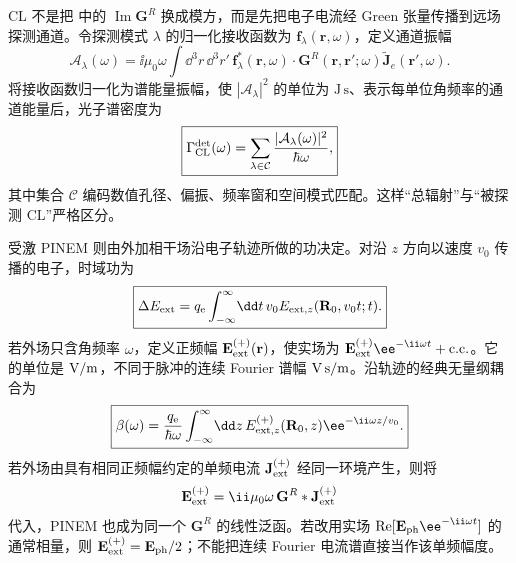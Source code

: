 \begin{definition}[收集通道振幅与光子谱]
CL 不是把 中的 $\operatorname{Im}\mathbf G^R$ 换成模方，而是先把电子电流经 Green 张量传播到远场探测通道。令探测模式 $\lambda$ 的归一化接收函数为 $\mathbf f_\lambda(\mathbf r,\omega)$，定义通道振幅
\begin{equation}
 \mathcal A_\lambda(\omega)
 =\ii\mu_0\omega
 \int\!\dd^3 r\,\dd^3 r'\,
 \mathbf f_\lambda^*(\mathbf r,\omega)\!\cdot
 \mathbf G^R(\mathbf r,\mathbf r';\omega)
 \widetilde{\mathbf J}_e(\mathbf r',\omega).
\label{eq:cl_channel_amplitude_dp47}
\end{equation}
将接收函数归一化为谱能量振幅，使 $|\mathcal A_\lambda|^2$ 的单位为 $\mathrm{J\,s}$、表示每单位角频率的通道能量后，光子谱密度为
\begin{equation}
\boxed{
 \Gamma_{\rm CL}^{\rm det}(\omega)
 =\sum_{\lambda\in\mathcal C}
 \frac{|\mathcal A_\lambda(\omega)|^2}{\hbar\omega},}
\label{eq:cl_detected_green_master_dp47}
\end{equation}
其中集合 $\mathcal C$ 编码数值孔径、偏振、频率窗和空间模式匹配。这样“总辐射”与“被探测 CL”严格区分。

\end{definition}

\begin{proposition}[相干驱动的轨迹积分]
受激 PINEM 则由外加相干场沿电子轨迹所做的功决定。对沿 $z$ 方向以速度 $v_0$ 传播的电子，时域功为
\begin{equation}
\boxed{
 \Delta E_{\rm ext}
 =q_{\mathrm e}\int_{-\infty}^{\infty}\!\dd t\,
 v_0 E_{{\rm ext},z}(\mathbf R_0,v_0t;t).}
\label{eq:pinem_time_domain_work_dp68}
\end{equation}
若外场只含角频率 $\omega$，定义正频幅 $\mathbf E_{\rm ext}^{(+)}(\mathbf r)$，使实场为 $\mathbf E_{\rm ext}^{(+)}\ee^{-\ii\omega t}+\mathrm{c.c.}$。它的单位是 ${\rm V/m}$，不同于脉冲的连续 Fourier 谱幅 ${\rm V\,s/m}$。沿轨迹的经典无量纲耦合为
\begin{equation}
\boxed{
 \beta(\omega)
 =\frac{q_{\mathrm e}}{\hbar\omega}
 \int_{-\infty}^{\infty}\!\dd z\,
 E_{{\rm ext},z}^{(+)}(\mathbf R_0,z)
 \ee^{-\ii\omega z/v_0}.}
\label{eq:pinem_beta_green_unified_dp47}
\end{equation}
若外场由具有相同正频幅约定的单频电流 $\mathbf J_{\rm ext}^{(+)}$ 经同一环境产生，则将
\begin{equation*}
 \mathbf E_{\rm ext}^{(+)}
 =\ii\mu_0\omega\,\mathbf G^R*\mathbf J_{\rm ext}^{(+)}
\end{equation*}
代入，PINEM 也成为同一个 $\mathbf G^R$ 的线性泛函。若改用实场 $\operatorname{Re}[\mathbf E_{\rm ph}\ee^{-\ii\omega t}]$ 的通常相量，则 $\mathbf E_{\rm ext}^{(+)}=\mathbf E_{\rm ph}/2$；不能把连续 Fourier 电流谱直接当作该单频幅度。

\end{proposition}

